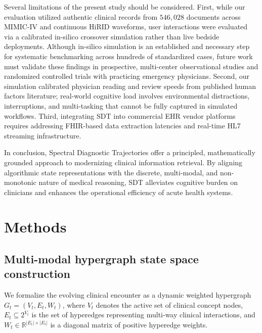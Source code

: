 \documentclass[12pt]{article}
\newcommand{\R}{\mathbb{R}}
\begin{document}
Several limitations of the present study should be considered. First, while our evaluation utilized authentic clinical records from $546{,}028$ documents across MIMIC-IV and continuous HiRID waveforms, user interactions were evaluated via a calibrated in-silico crossover simulation rather than live bedside deployments. Although in-silico simulation is an established and necessary step for systematic benchmarking across hundreds of standardized cases\cite{zakka2024almanac,wornow2023shaky}, future work must validate these findings in prospective, multi-center observational studies and randomized controlled trials with practicing emergency physicians. Second, our simulation calibrated physician reading and review speeds from published human factors literature; real-world cognitive load involves environmental distractions, interruptions, and multi-tasking that cannot be fully captured in simulated workflows\cite{harry2018cognitive,tubbs2020balancing}. Third, integrating SDT into commercial EHR vendor platforms requires addressing FHIR-based data extraction latencies and real-time HL7 streaming infrastructure.

In conclusion, Spectral Diagnostic Trajectories offer a principled, mathematically grounded approach to modernizing clinical information retrieval. By aligning algorithmic state representations with the discrete, multi-modal, and non-monotonic nature of medical reasoning, SDT alleviates cognitive burden on clinicians and enhances the operational efficiency of acute health systems.

\section*{Methods}

\subsection*{Multi-modal hypergraph state space construction}

We formalize the evolving clinical encounter as a dynamic weighted hypergraph $G_t = (V_t, E_t, W_t)$, where $V_t$ denotes the active set of clinical concept nodes, $E_t \subseteq 2^{V_t}$ is the set of hyperedges representing multi-way clinical interactions, and $W_t \in \R^{|E_t| \times |E_t|}$ is a diagonal matrix of positive hyperedge weights.
\end{document}
